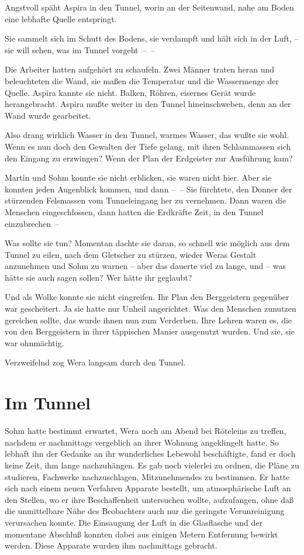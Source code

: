 Angstvoll späht Aspira in den Tunnel, worin an der Seitenwand, nahe
am Boden eine lebhafte Quelle entspringt.

Sie sammelt sich im Schutt des Bodens, sie verdampft und hält sich
in der Luft, – sie will sehen, was im Tunnel vorgeht~–~–

Die Arbeiter hatten aufgehört zu schaufeln. Zwei Männer traten
heran und beleuchteten die Wand, sie maßen die Temperatur und die
Wassermenge der Quelle. Aspira kannte sie nicht. Balken, Röhren,
eisernes Gerät wurde herangebracht. Aspira mußte weiter in den
Tunnel hineinschweben, denn an der Wand wurde gearbeitet.

Also drang wirklich Wasser in den Tunnel, warmes Wasser, das wußte
sie wohl. Wenn es nun doch den Gewalten der Tiefe gelang, mit ihren
Schlammassen sich den Eingang zu erzwingen? Wenn der Plan der
Erdgeister zur Ausführung kam?

Martin und Sohm konnte sie nicht erblicken, sie waren nicht hier.
Aber sie konnten jeden Augenblick kommen, und dann –~– Sie
fürchtete, den Donner der stürzenden Felsmassen vom Tunneleingang
her zu vernehmen. Dann waren die Menschen eingeschlossen, dann
hatten die Erdkräfte Zeit, in den Tunnel einzubrechen~–

Was sollte sie tun? Momentan dachte sie daran, so schnell wie
möglich aus dem Tunnel zu eilen, nach dem Gletscher zu stürzen,
wieder Weras Gestalt anzunehmen und Sohm zu warnen – aber das
dauerte viel zu lange, und – was hätte sie auch sagen sollen? Wer
hätte ihr geglaubt?

Und als Wolke konnte sie nicht eingreifen. Ihr Plan den
Berggeistern gegenüber war gescheitert. Ja sie hatte nur Unheil
angerichtet. Was den Menschen zunutzen gereichen sollte, das wurde
ihnen nun zum Verderben. Ihre Lehren waren es, die von den
Berggeistern in ihrer täppischen Manier ausgenutzt wurden. Und sie,
sie war ohnmächtig.

Verzweifelnd zog Wera langsam durch den Tunnel.

\section{Im Tunnel}

Sohm hatte bestimmt erwartet, Wera noch am Abend bei Röteleins zu
treffen, nachdem er nachmittags vergeblich an ihrer Wohnung
angeklingelt hatte. So lebhaft ihn der Gedanke an ihr wunderliches
Lebewohl beschäftigte, fand er doch keine Zeit, ihm lange
nachzuhängen. Es gab noch vielerlei zu ordnen, die Pläne zu
studieren, Fachwerke nachzuschlagen, Mitzunehmendes zu bestimmen.
Er hatte sich nach einem neuen Verfahren Apparate bestellt, um
atmosphärische Luft an den Stellen, wo er ihre Beschaffenheit
untersuchen wollte, aufzufangen, ohne daß die unmittelbare Nähe des
Beobachters auch nur die geringste Verunreinigung verursachen
konnte. Die Einsaugung der Luft in die Glasflasche und der
momentane Abschluß konnten dabei aus einigen Metern Entfernung
bewirkt werden. Diese Apparate wurden ihm nachmittags gebracht.

